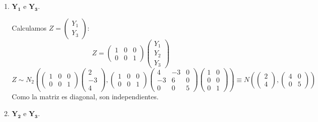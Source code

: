 \documentclass[11pt,a4paper]{article}
\begin{document}
\begin{enumerate}[label=\arabic*.]
\begin{enumerate}[label=\alph*)]
\bfseries
\vspace{1cm}
\item $\mathbf{Y_{1}}$ e $\mathbf{Y_{3}}$.
\vspace{0.5cm}
\normalfont

Calculamos $Z = \begin{pmatrix} Y_{1} \\ Y_{3} \end{pmatrix}$:
$$Z = \begin{pmatrix}
1 & 0 & 0 \\
0 & 0 & 1
\end{pmatrix} \begin{pmatrix} Y_{1} \\ Y_{2} \\ Y_{3} \end{pmatrix}$$
$$Z \sim N_{2}(\begin{pmatrix}
1 & 0 & 0 \\
0 & 0 & 1
\end{pmatrix} \begin{pmatrix} 2 \\ -3 \\ 4 \end{pmatrix}, \begin{pmatrix}
1 & 0 & 0 \\
0 & 0 & 1
\end{pmatrix} \begin{pmatrix}
4 & -3 & 0 \\
-3 & 6 & 0 \\
0 & 0 & 5
\end{pmatrix} \begin{pmatrix}
1 & 0 \\
0 & 0 \\
0 & 1
\end{pmatrix}) \equiv N(\begin{pmatrix} 2 \\ 4 \end{pmatrix}, \begin{pmatrix}
4 & 0 \\
0 & 5
\end{pmatrix})$$
Como la matriz es diagonal, son independientes.

\bfseries
\vspace{1cm}
\item $\mathbf{Y_{2}}$ e $\mathbf{Y_{3}}$.
\vspace{0.5cm}
\normalfont


\end{enumerate}
\end{enumerate}
\end{document}
